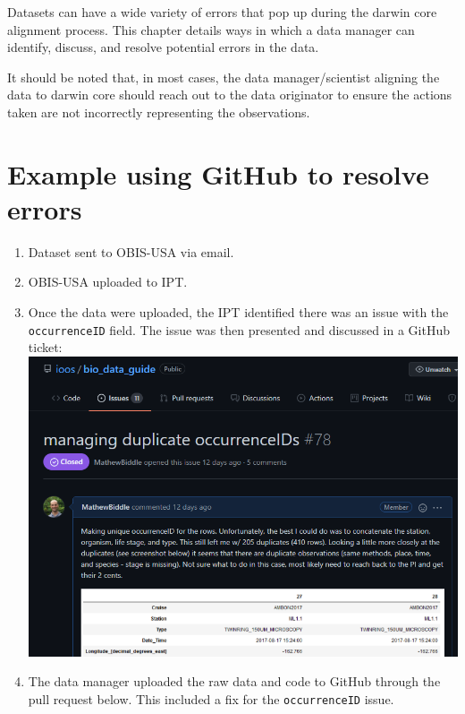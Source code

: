 \documentclass[
]{book}
\providecommand{\tightlist}{%
  \setlength{\itemsep}{0pt}\setlength{\parskip}{0pt}}
\begin{document}
Datasets can have a wide variety of errors that pop up during the darwin core alignment process. This chapter details
ways in which a data manager can identify, discuss, and resolve potential errors in the data.

It should be noted that, in most cases, the data manager/scientist aligning the data to darwin core should reach out
to the data originator to ensure the actions taken are not incorrectly representing the observations.

\hypertarget{example-using-github-to-resolve-errors}{%
\section{Example using GitHub to resolve errors}\label{example-using-github-to-resolve-errors}}

\begin{enumerate}
\def\labelenumi{\arabic{enumi}.}
\tightlist
\item
  Dataset sent to OBIS-USA via email.
\item
  OBIS-USA uploaded to IPT.
\item
  Once the data were uploaded, the IPT identified there was an issue with the \texttt{occurrenceID} field. The issue was then
  presented and discussed in a GitHub ticket:
  \href{https://github.com/ioos/bio_data_guide/issues/78}{\includegraphics{./figs/issue_78.png}}
\item
  The data manager uploaded the raw data and code to GitHub through the pull request below. This included a fix for
  the \texttt{occurrenceID} issue.

\end{enumerate}
\end{document}
